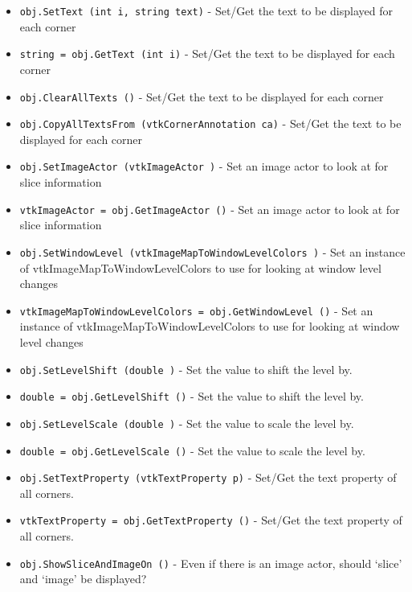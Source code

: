 \begin{itemize}
\item  \verb|obj.SetText (int i, string text)| -  Set/Get the text to be displayed for each corner

\item  \verb|string = obj.GetText (int i)| -  Set/Get the text to be displayed for each corner

\item  \verb|obj.ClearAllTexts ()| -  Set/Get the text to be displayed for each corner

\item  \verb|obj.CopyAllTextsFrom (vtkCornerAnnotation ca)| -  Set/Get the text to be displayed for each corner

\item  \verb|obj.SetImageActor (vtkImageActor )| -  Set an image actor to look at for slice information

\item  \verb|vtkImageActor = obj.GetImageActor ()| -  Set an image actor to look at for slice information

\item  \verb|obj.SetWindowLevel (vtkImageMapToWindowLevelColors )| -  Set an instance of vtkImageMapToWindowLevelColors to use for
 looking at window level changes

\item  \verb|vtkImageMapToWindowLevelColors = obj.GetWindowLevel ()| -  Set an instance of vtkImageMapToWindowLevelColors to use for
 looking at window level changes

\item  \verb|obj.SetLevelShift (double )| -  Set the value to shift the level by.

\item  \verb|double = obj.GetLevelShift ()| -  Set the value to shift the level by.

\item  \verb|obj.SetLevelScale (double )| -  Set the value to scale the level by.

\item  \verb|double = obj.GetLevelScale ()| -  Set the value to scale the level by.

\item  \verb|obj.SetTextProperty (vtkTextProperty p)| -  Set/Get the text property of all corners.

\item  \verb|vtkTextProperty = obj.GetTextProperty ()| -  Set/Get the text property of all corners.

\item  \verb|obj.ShowSliceAndImageOn ()| -  Even if there is an image actor, should `slice' and `image' be displayed?


\end{itemize}
